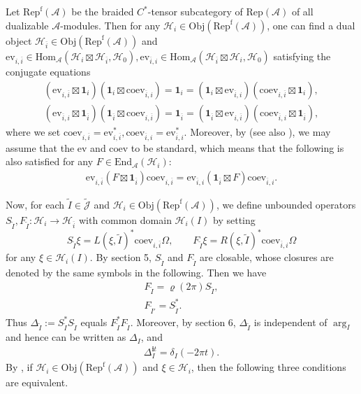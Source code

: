 \documentclass[11pt,b5paper,notitlepage]{article}
\theoremstyle{definition}
\theoremstyle{plain}
\newcommand{\mc}{\mathcal}
\newcommand{\wtd}{\widetilde}
\newcommand{\ovl}{\overline}
\newcommand{\End}{\mathrm{End}} %
\newcommand{\id}{\mathbf{1}}
\newcommand{\Hom}{\mathrm{Hom}}
\newcommand{\ev}{\mathrm{ev}}
\newcommand{\coev}{\mathrm{coev}}
\newcommand{\Jtd}{\widetilde{\mathcal J}}
\newcommand{\im}{\mathbf{i}}
\newcommand{\RepA}{\mathrm{Rep}(\mc A)}
\newcommand{\RepfA}{\mathrm{Rep}^{\mathrm f}(\mc A)}
\newcommand{\Obj}{\mathrm{Obj}}
\numberwithin{equation}{subsection}
\begin{document}
Let $\RepfA$ be the braided $C^*$-tensor subcategory of $\RepA$ of all dualizable $\mc A$-modules. Then for any $\mc H_i\in\Obj(\RepfA)$, one can find a dual object $\mc H_{\ovl i}\in\Obj(\RepfA)$ and $\ev_{i,\ovl i}\in\Hom_{\mc A}(\mc H_i\boxtimes\mc H_{\ovl i},\mc H_0),\ev_{\ovl i,i}\in\Hom_{\mc A}(\mc H_{\ovl i}\boxtimes\mc H_i,\mc H_0)$ satisfying the conjugate equations
\begin{gather*}
(\ev_{i,\ovl i}\boxtimes\id_i)(\id_i\boxtimes\coev_{\ovl i,i})=\id_i=(\id_i\boxtimes\ev_{\ovl i,i})(\coev_{i,\ovl i}\boxtimes\id_i),\\
(\ev_{\ovl i,i}\boxtimes\id_{\ovl i})(\id_{\ovl i}\boxtimes\coev_{i,\ovl i})=\id_{\ovl i}=(\id_{\ovl i}\boxtimes\ev_{i,\ovl i})(\coev_{\ovl i,i}\boxtimes\id_{\ovl i}),
\end{gather*}
where we set $\coev_{i,\ovl i}=\ev_{i,\ovl i}^*,\coev_{\ovl i,i}=\ev_{\ovl i,i}^*$. Moreover, by \cite{LR97} (see also \cite{Yam04,BDH14}),  we may assume that the $\ev$ and $\coev$ to be standard, which means that the following is also satisfied for any $F\in\End_{\mc A}(\mc H_i)$:
\begin{align}
\ev_{i,\ovl i}(F\boxtimes\id_{\ovl i})\coev_{i,\ovl i}=\ev_{\ovl i,i}(\id_{\ovl i}\boxtimes F)\coev_{\ovl i,i}.
\end{align}

Now, for each $\wtd I\in\Jtd$ and $\mc H_i\in\Obj(\RepfA)$, we define unbounded operators $S_{\wtd I},F_{\wtd I}:\mc H_i\rightarrow\mc H_{\ovl i}$ with common domain $\mc H_i(I)$  by setting
\begin{equation*}
S_{\wtd I}\xi=L(\xi,\wtd I)^*\coev_{i,\ovl i}\Omega,\qquad F_{\wtd I}\xi=R(\xi,\wtd I)^*\coev_{\ovl i,i}\Omega
\end{equation*}
for any $\xi\in\mc H_i(I)$. By \cite{Gui21b} section 5, $S_{\wtd I}$ and $F_{\wtd I}$ are closable, whose closures are denoted by the same symbols in the following. Then we have
\begin{gather}
F_{\wtd I}=\varrho(2\pi)S_{\wtd I},\\
F_{\wtd I'}=S_{\wtd I}^*.
\end{gather}
Thus $\Delta_{\wtd I}:=S_{\wtd I}^*S_{\wtd I}$ equals $F_{\wtd I}^*F_{\wtd I}$. Moreover, by \cite{Gui21b} section 6, $\Delta_{\wtd I}$ is independent of $\arg_I$ and hence can be written as $\Delta_I$, and
\begin{align}
\Delta_I^{\im t}=\delta_I(-2\pi t).
\end{align}
By \cite[Thm. 7.8]{Gui21b}, if $\mc H_i\in\Obj(\RepfA)$ and $\xi\in\mc H_i$, then the following three conditions are equivalent.
\end{document}
